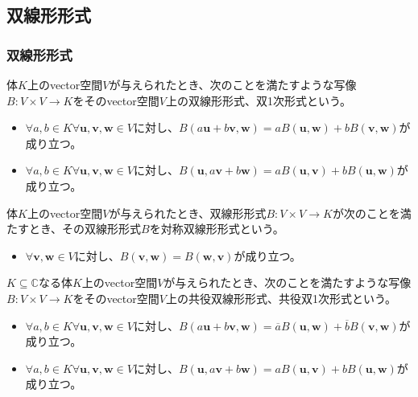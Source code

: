 \documentclass[dvipdfmx]{jsarticle}
\begin{document}
\subsection{双線形形式}%
\subsubsection{双線形形式}%
\begin{axs}[双線形形式の公理]
体$K$上のvector空間$V$が与えられたとき、次のことを満たすような写像$B:V \times V \rightarrow K$をそのvector空間$V$上の双線形形式、双1次形式という。
\begin{itemize}
\item
  $\forall a,b \in K\forall\mathbf{u},\mathbf{v},\mathbf{w} \in V$に対し、$B\left( a\mathbf{u} + b\mathbf{v},\mathbf{w} \right) = aB\left( \mathbf{u},\mathbf{w} \right) + bB\left( \mathbf{v},\mathbf{w} \right)$が成り立つ。
\item
  $\forall a,b \in K\forall\mathbf{u},\mathbf{v},\mathbf{w} \in V$に対し、$B\left( \mathbf{u},a\mathbf{v} + b\mathbf{w} \right) = aB\left( \mathbf{u},\mathbf{v} \right) + bB\left( \mathbf{u},\mathbf{w} \right)$が成り立つ。
\end{itemize}
\end{axs}
\begin{dfn}
体$K$上のvector空間$V$が与えられたとき、双線形形式$B:V \times V \rightarrow K$が次のことを満たすとき、その双線形形式$B$を対称双線形形式という。
\begin{itemize}
\item
  $\forall\mathbf{v},\mathbf{w} \in V$に対し、$B\left( \mathbf{v},\mathbf{w} \right) = B\left( \mathbf{w},\mathbf{v} \right)$が成り立つ。
\end{itemize}
\end{dfn}
\begin{dfn}
$K \subseteq \mathbb{C}$なる体$K$上のvector空間$V$が与えられたとき、次のことを満たすような写像$B:V \times V \rightarrow K$をそのvector空間$V$上の共役双線形形式、共役双1次形式という。
\begin{itemize}
\item
  $\forall a,b \in K\forall\mathbf{u},\mathbf{v},\mathbf{w} \in V$に対し、$B\left( a\mathbf{u} + b\mathbf{v},\mathbf{w} \right) = \overline{a}B\left( \mathbf{u},\mathbf{w} \right) + \overline{b}B\left( \mathbf{v},\mathbf{w} \right)$が成り立つ。
\item
  $\forall a,b \in K\forall\mathbf{u},\mathbf{v},\mathbf{w} \in V$に対し、$B\left( \mathbf{u},a\mathbf{v} + b\mathbf{w} \right) = aB\left( \mathbf{u},\mathbf{v} \right) + bB\left( \mathbf{u},\mathbf{w} \right)$が成り立つ。
\end{itemize}
\end{dfn}
\end{document}

